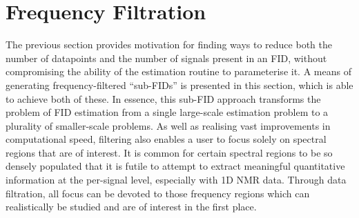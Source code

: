 \section{Frequency Filtration}
\label{sec:filtering}
The previous section provides motivation for finding ways to reduce both the
number of datapoints and the number of signals present in an \ac{FID},
without compromising the ability of the estimation routine
to parameterise it. A means of generating frequency-filtered ``sub-\acp{FID}''
is presented in this section, which is able to achieve both of these. In
essence, this sub-\ac{FID} approach transforms the problem of \ac{FID} estimation from a
single large-scale estimation problem to a plurality of smaller-scale problems.
As well as realising vast improvements in computational speed, filtering also
enables a user to focus solely on spectral regions that are of interest.
It is common for certain spectral regions to be so densely populated
that it is futile to attempt to extract meaningful quantitative information at
the per-signal level, especially with \ac{1D} \ac{NMR} data.
Through data filtration, all focus can be devoted to those frequency regions
which can realistically be studied and are of interest in the first place.

